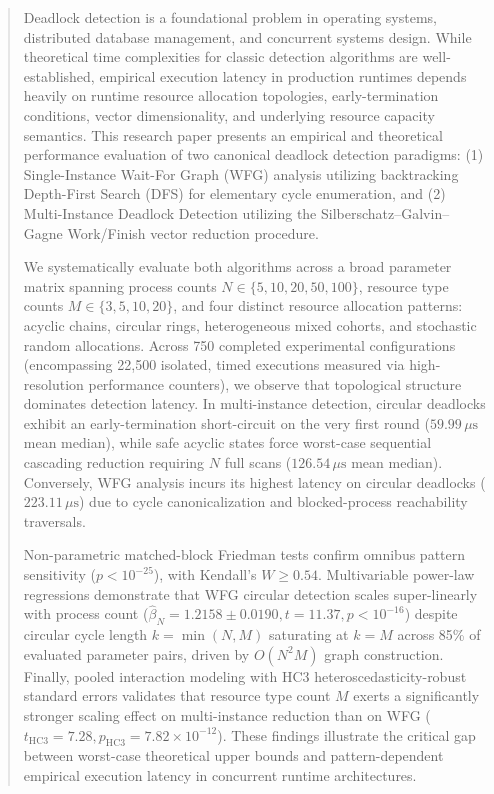 \documentclass[11pt,a4paper]{article}
\begin{document}
\newpage
\tableofcontents
\newpage

\begin{abstract}
Deadlock detection is a foundational problem in operating systems, distributed database management, and concurrent systems design. While theoretical time complexities for classic detection algorithms are well-established, empirical execution latency in production runtimes depends heavily on runtime resource allocation topologies, early-termination conditions, vector dimensionality, and underlying resource capacity semantics. This research paper presents an empirical and theoretical performance evaluation of two canonical deadlock detection paradigms: (1) Single-Instance Wait-For Graph (WFG) analysis utilizing backtracking Depth-First Search (DFS) for elementary cycle enumeration, and (2) Multi-Instance Deadlock Detection utilizing the Silberschatz--Galvin--Gagne Work/Finish vector reduction procedure. 

We systematically evaluate both algorithms across a broad parameter matrix spanning process counts $N \in \{5, 10, 20, 50, 100\}$, resource type counts $M \in \{3, 5, 10, 20\}$, and four distinct resource allocation patterns: acyclic chains, circular rings, heterogeneous mixed cohorts, and stochastic random allocations. Across 750 completed experimental configurations (encompassing 22,500 isolated, timed executions measured via high-resolution performance counters), we observe that topological structure dominates detection latency. In multi-instance detection, circular deadlocks exhibit an early-termination short-circuit on the very first round ($59.99\,\mu\text{s}$ mean median), while safe acyclic states force worst-case sequential cascading reduction requiring $N$ full scans ($126.54\,\mu\text{s}$ mean median). Conversely, WFG analysis incurs its highest latency on circular deadlocks ($223.11\,\mu\text{s}$) due to cycle canonicalization and blocked-process reachability traversals. 

Non-parametric matched-block Friedman tests confirm omnibus pattern sensitivity ($p < 10^{-25}$), with Kendall's $W \ge 0.54$. Multivariable power-law regressions demonstrate that WFG circular detection scales super-linearly with process count ($\hat{\beta}_N = 1.2158 \pm 0.0190, t = 11.37, p < 10^{-16}$) despite circular cycle length $k = \min(N, M)$ saturating at $k=M$ across 85\% of evaluated parameter pairs, driven by $O(N^2 M)$ graph construction. Finally, pooled interaction modeling with HC3 heteroscedasticity-robust standard errors validates that resource type count $M$ exerts a significantly stronger scaling effect on multi-instance reduction than on WFG ($t_{\text{HC3}} = 7.28, p_{\text{HC3}} = 7.82 \times 10^{-12}$). These findings illustrate the critical gap between worst-case theoretical upper bounds and pattern-dependent empirical execution latency in concurrent runtime architectures.
\end{abstract}
\end{document}
